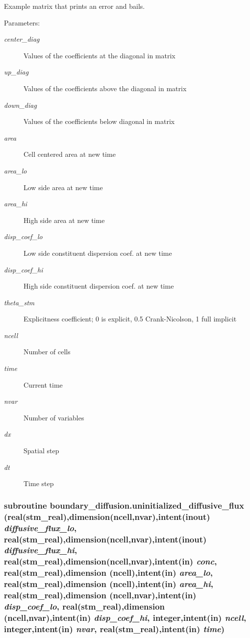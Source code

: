 Example matrix that prints an error and bails. 

\begin{Desc}
\item[Parameters:]
\begin{description}
\item[{\em center\_\-diag}]Values of the coefficients at the diagonal in matrix\item[{\em up\_\-diag}]Values of the coefficients above the diagonal in matrix\item[{\em down\_\-diag}]Values of the coefficients below diagonal in matrix\item[{\em area}]Cell centered area at new time \item[{\em area\_\-lo}]Low side area at new time\item[{\em area\_\-hi}]High side area at new time \item[{\em disp\_\-coef\_\-lo}]Low side constituent dispersion coef. at new time\item[{\em disp\_\-coef\_\-hi}]High side constituent dispersion coef. at new time\item[{\em theta\_\-stm}]Explicitness coefficient; 0 is explicit, 0.5 Crank-Nicolson, 1 full implicit \item[{\em ncell}]Number of cells\item[{\em time}]Current time\item[{\em nvar}]Number of variables\item[{\em dx}]Spatial step \item[{\em dt}]Time step \end{description}
\end{Desc}
\hypertarget{a00051_c27cf26f93c52ce9d432267264793736}{
\subsubsection[{uninitialized\_\-diffusive\_\-flux}]{\setlength{\rightskip}{0pt plus 5cm}subroutine boundary\_\-diffusion.uninitialized\_\-diffusive\_\-flux (real(stm\_\-real),dimension(ncell,nvar),intent(inout) {\em diffusive\_\-flux\_\-lo}, \/  real(stm\_\-real),dimension(ncell,nvar),intent(inout) {\em diffusive\_\-flux\_\-hi}, \/  real(stm\_\-real),dimension(ncell,nvar),intent(in) {\em conc}, \/  real(stm\_\-real),dimension         (ncell),intent(in) {\em area\_\-lo}, \/  real(stm\_\-real),dimension         (ncell),intent(in) {\em area\_\-hi}, \/  real(stm\_\-real),dimension (ncell,nvar),intent(in) {\em disp\_\-coef\_\-lo}, \/  real(stm\_\-real),dimension (ncell,nvar),intent(in) {\em disp\_\-coef\_\-hi}, \/  integer,intent(in) {\em ncell}, \/  integer,intent(in) {\em nvar}, \/  real(stm\_\-real),intent(in) {\em time})}}
\label{a00051_c27cf26f93c52ce9d432267264793736}


